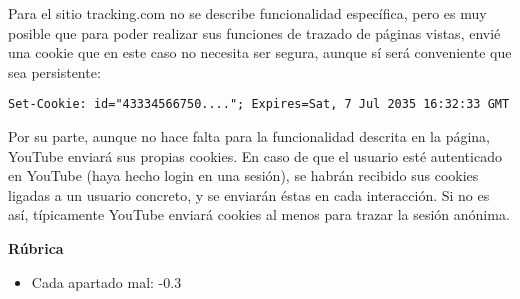 Para el sitio tracking.com no se describe funcionalidad específica, pero es muy posible que para poder realizar sus funciones de trazado de páginas vistas, envié una cookie que en este caso no necesita ser segura, aunque sí será conveniente que sea persistente:

\begin{verbatim}
Set-Cookie: id="43334566750...."; Expires=Sat, 7 Jul 2035 16:32:33 GMT
\end{verbatim}

Por su parte, aunque no hace falta para la funcionalidad descrita en la página, YouTube enviará sus propias cookies. En caso de que el usuario esté autenticado en YouTube (haya hecho login en una sesión), se habrán recibido sus cookies ligadas a un usuario concreto, y se enviarán éstas en cada interacción. Si no es así, típicamente YouTube enviará cookies al menos para trazar la sesión anónima.

\vspace{.4cm}\textbf{Rúbrica}

\begin{itemize}
\item Cada apartado mal: -0.3
\end{itemize}



